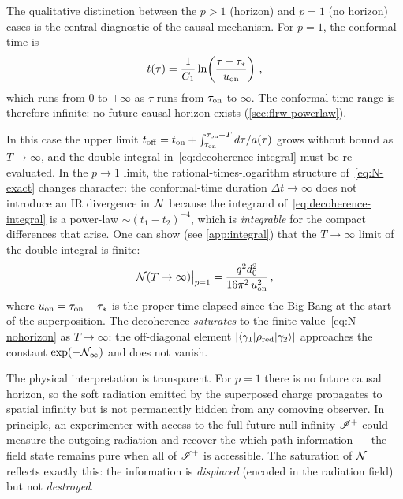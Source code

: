 The qualitative distinction between the $p > 1$ (horizon) and $p = 1$ (no horizon)
cases is the central diagnostic of the causal mechanism.  For $p = 1$, the
conformal time is
%
\begin{equation}
  t(\tau) = \frac{1}{C_{1}}\ln\!\left(\frac{\tau - \tau_{*}}{u_{\rm on}}\right) \,,
  \label{eq:t-pone}
\end{equation}
%
which runs from $0$ to $+\infty$ as $\tau$ runs from $\tau_{\rm on}$ to
$\infty$.  The conformal time range is therefore infinite: no future causal
horizon exists (\cref{sec:flrw-powerlaw}).

In this case the upper limit $t_{\rm off} = t_{\rm on} + \int_{\tau_{\rm on}}^{\tau_{\rm on}+T} d\tau/a(\tau)$
grows without bound as $T \to \infty$, and the double integral
in~\cref{eq:decoherence-integral} must be re-evaluated.  In the $p \to 1$
limit, the rational-times-logarithm structure of~\cref{eq:N-exact} changes
character: the conformal-time duration $\Delta t \to \infty$ does not introduce
an IR divergence in $\mathcal{N}$ because the integrand of~\cref{eq:decoherence-integral}
is a power-law $\sim(t_{1}-t_{2})^{-4}$, which is \emph{integrable} for the
compact differences that arise.  One can show (see \cref{app:integral}) that
the $T \to \infty$ limit of the double integral is finite:
%
\begin{equation}
  \mathcal{N}(T \to \infty)\big|_{p=1}
  =
  \frac{q^{2}d_{0}^{2}}{16\pi^{2}\,u_{\rm on}^{2}} \,,
  \label{eq:N-nohorizon}
\end{equation}
%
where $u_{\rm on} = \tau_{\rm on} - \tau_{*}$ is the proper time elapsed since
the Big Bang at the start of the superposition.  The decoherence \emph{saturates}
to the finite value~\cref{eq:N-nohorizon} as $T \to \infty$: the off-diagonal
element $|\langle \gamma_{1}|\rho_{\rm red}|\gamma_{2}\rangle|$ approaches the
constant $\exp(-\mathcal{N}_{\infty})$ and does not vanish.

The physical interpretation is transparent.  For $p = 1$ there is no future
causal horizon, so the soft radiation emitted by the superposed charge propagates
to spatial infinity but is not permanently hidden from any comoving observer.
In principle, an experimenter with access to the full future null infinity
$\mathscr{I}^{+}$ could measure the outgoing radiation and recover the which-path
information — the field state remains pure when all of $\mathscr{I}^{+}$ is accessible.
The saturation of $\mathcal{N}$ reflects exactly this: the information is \emph{displaced}
(encoded in the radiation field) but not \emph{destroyed}.

